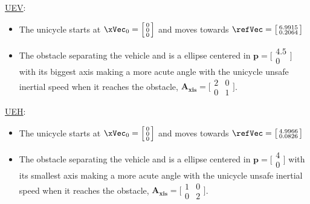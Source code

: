 \underline{UEV}:
\label{ssssec:UEV} %
\begin{itemize}
  \item The unicycle starts at \(\xVec_0 = \Bigl[\begin{smallmatrix} 0 \\ 0 \\ 0 \end{smallmatrix}\Bigr]\) and moves towards  \(\refVec = \bigl[\begin{smallmatrix} 6.9915 \\ 0.2064 \end{smallmatrix}\bigr]\)
  \item The obstacle separating the vehicle and \txtref is a ellipse centered in \(\mathbf{p} = \bigl[\begin{smallmatrix} 4.5 \\ 0 \end{smallmatrix}\bigr] \) with its biggest axis making a more acute angle with the unicycle unsafe inertial speed when it reaches the obstacle, \(\mathbf{A_{xis}} = \bigl[\begin{smallmatrix} 2 & 0\\ 0 & 1\end{smallmatrix}\bigr]\).
\end{itemize}

\underline{UEH}:
\label{ssssec:UEH} %
\begin{itemize}
  \item The unicycle starts at \(\xVec_0 = \Bigl[\begin{smallmatrix} 0 \\ 0 \\ 0 \end{smallmatrix}\Bigr]\) and moves towards  \(\refVec = \bigl[\begin{smallmatrix} 4.9966 \\ 0.0826 \end{smallmatrix}\bigr]\)
  \item The obstacle separating the vehicle and \txtref is a ellipse centered in \(\mathbf{p} = \bigl[\begin{smallmatrix} 4 \\ 0 \end{smallmatrix}\bigr] \) with its smallest axis making a more acute angle with the unicycle unsafe inertial speed when it reaches the obstacle, \(\mathbf{A_{xis}} = \bigl[\begin{smallmatrix} 1 & 0\\ 0 & 2\end{smallmatrix}\bigr]\).
\end{itemize}


